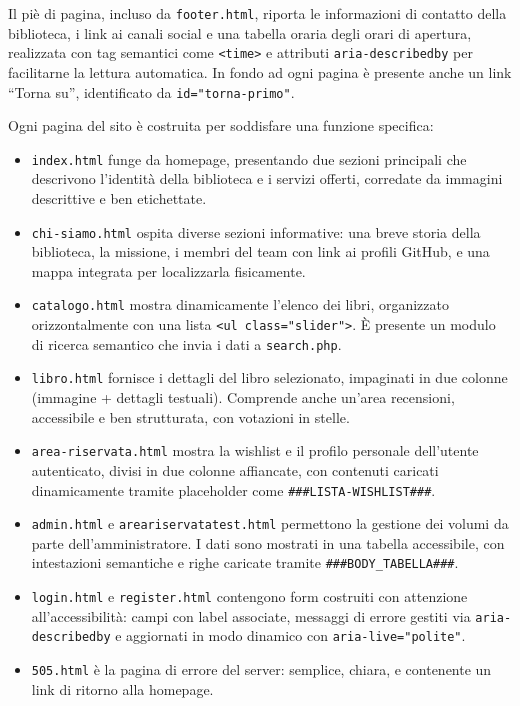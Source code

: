 \documentclass{article}
\begin{document}
Il piè di pagina, incluso da \texttt{footer.html}, riporta le informazioni di contatto della biblioteca, i link ai canali social e una tabella oraria degli orari di apertura, realizzata con tag semantici come \texttt{<time>} e attributi \texttt{aria-describedby} per facilitarne la lettura automatica.  
In fondo ad ogni pagina è presente anche un link “Torna su”, identificato da \texttt{id="torna-primo"}.

\medskip

Ogni pagina del sito è costruita per soddisfare una funzione specifica:

\begin{itemize}
  \item \texttt{index.html} funge da homepage, presentando due sezioni principali che descrivono l’identità della biblioteca e i servizi offerti, corredate da immagini descrittive e ben etichettate.
  
  \item \texttt{chi-siamo.html} ospita diverse sezioni informative: una breve storia della biblioteca, la missione, i membri del team con link ai profili GitHub, e una mappa integrata per localizzarla fisicamente.

  \item \texttt{catalogo.html} mostra dinamicamente l’elenco dei libri, organizzato orizzontalmente con una lista \texttt{<ul class="slider">}. È presente un modulo di ricerca semantico che invia i dati a \texttt{search.php}.

  \item \texttt{libro.html} fornisce i dettagli del libro selezionato, impaginati in due colonne (immagine + dettagli testuali). Comprende anche un’area recensioni, accessibile e ben strutturata, con votazioni in stelle.

  \item \texttt{area-riservata.html} mostra la wishlist e il profilo personale dell’utente autenticato, divisi in due colonne affiancate, con contenuti caricati dinamicamente tramite placeholder come \texttt{\#\#\#LISTA-WISHLIST\#\#\#}.

  \item \texttt{admin.html} e \texttt{areariservatatest.html} permettono la gestione dei volumi da parte dell’amministratore. I dati sono mostrati in una tabella accessibile, con intestazioni semantiche e righe caricate tramite \texttt{\#\#\#BODY\_TABELLA\#\#\#}.

  \item \texttt{login.html} e \texttt{register.html} contengono form costruiti con attenzione all’accessibilità: campi con label associate, messaggi di errore gestiti via \texttt{aria-describedby} e aggiornati in modo dinamico con \texttt{aria-live="polite"}.

  \item \texttt{505.html} è la pagina di errore del server: semplice, chiara, e contenente un link di ritorno alla homepage.
\end{itemize}
\end{document}
